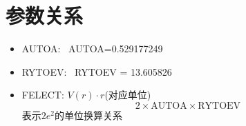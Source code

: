 

\section{参数关系}
\begin{itemize}
	\item \textrm{AUTOA}:~ \textrm{AUTOA}=0.529177249
	\item \textrm{RYTOEV}:~ \textrm{RYTOEV} = 13.605826
	\item \textrm{FELECT}: $V(r)\cdot r$(对应单位)
		\begin{displaymath}
			2\times\textrm{AUTOA}\times\textrm{RYTOEV}
		\end{displaymath}
		表示$2e^2$的单位换算关系
\end{itemize}
